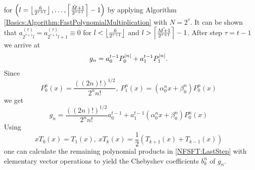 for $\left(l=\left\lfloor\frac{\tilde{n}}{2^{\tau+1}}\right\rfloor,\ldots,\left\lceil\frac{\tilde{M}+1}{2^{\tau+1}}\right\rceil-1\right)$
by applying Algorithm \ref{Basics:Algorithm:FastPolynomialMultiplication} with $N=2^{\tau}$. It can be shown that
$a_{2^{\tau+1}l}^{(\tau)} = a_{2^{\tau+1}l+1}^{(\tau)} \equiv 0$ for $l < \left\lfloor\frac{\tilde{n}}{2^{\tau+1}}\right\rfloor$ and 
$l > \left\lceil\frac{\tilde{M+1}}{2^{\tau+1}}\right\rceil-1$.
After step $\tau = t-1$ we arrive at
\begin{equation}
  \nonumber
  g_n = a_{0}^{t-1} P_{0}^{\left\vert n\right\vert} + a_{1}^{t-1} P_{1}^{\left\vert n\right\vert}.
\end{equation}
Since 
\begin{equation}
  \nonumber
  P_{0}^n(x) = \frac{\left( \left( 2n \right) ! \right)^{1/2}}{2^n n!},\ P_{1}^n(x) = \left(\alpha_{0}^nx + \beta_{0}^n\right)P_{0}^n(x)
\end{equation} 
we get
\begin{equation}
  \label{NFSFT:LastStep}
  g_n = \frac{\left( \left( 2n \right) ! \right)^{1/2}}{2^n n!} a_{0}^{t-1} + a_{1}^{t-1} \left(\alpha_{0}^nx + \beta_{0}^n\right)P_{0}^n(x)
\end{equation}
Using 
\begin{equation}
  \nonumber
  xT_{0}(x) = T_{1}(x),\ xT_{k}(x) = \frac{1}{2}\left( T_{k+1}(x) + T_{k-1}(x) \right)
\end{equation}
one can calculate the remaining polynomial products in \eqref{NFSFT:LastStep} with elementary 
vector operations to yield the Chebyshev coefficients $b_k^n$ of $g_n$.

